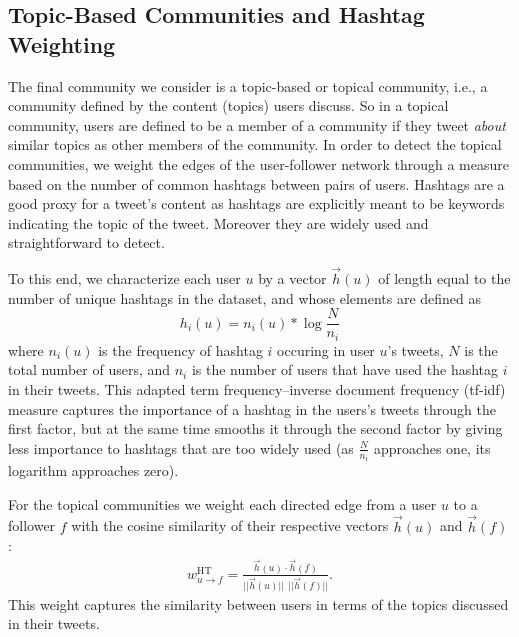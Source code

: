 \subsection{Topic-Based Communities and Hashtag Weighting}
\label{sec:method-topic}

The final community we consider is a topic-based or topical community, i.e., a community defined by the content (topics) users discuss. So in a topical community, users are defined to be a member of a community if they tweet \emph{about} similar topics as other members of the community. 
In order to detect the topical communities, we weight the edges of the user-follower network through a measure based on the number of common hashtags between pairs of users. Hashtags are a good proxy for a tweet's content as hashtags are explicitly meant to be keywords indicating the topic of the tweet. Moreover they are widely used and straightforward to detect. 

To this end, we characterize each user $u$ by a vector $\vec{h}(u)$ of length equal to the number of unique hashtags in the dataset, and whose elements are defined as
\begin{equation}
h_i(u) = n_i(u) * \log{ \frac{N}{n_i} }
\end{equation}
where $n_i(u)$ is the frequency of hashtag $i$ occuring in user $u$'s tweets, $N$ is the total number of users, and $n_i$ is the number of users that have used the hashtag $i$ in their tweets. This adapted term frequency--inverse document frequency (tf-idf) measure \cite{salton_introduction_1983} captures the importance of a hashtag in the users's tweets through the first factor, but at the same time smooths it through the second factor by giving less importance to hashtags that are too widely used (as $\frac{N}{n_i}$ approaches one, its logarithm approaches zero). 

For the topical communities we weight each directed edge from a user $u$ to a follower $f$ with the cosine similarity of their respective vectors $\vec{h}(u)$ and $\vec{h}(f)$:
\begin{align}
	w_{u \to f}^{\text{HT}} = \frac{\vec{h}(u) \cdot \vec{h}(f)}{||\vec{h}(u)|| \ \ ||\vec{h}(f)||}. \label{Eqn-EW-topic}
\end{align}
This weight captures the similarity between users in terms of the topics discussed in their tweets. 
